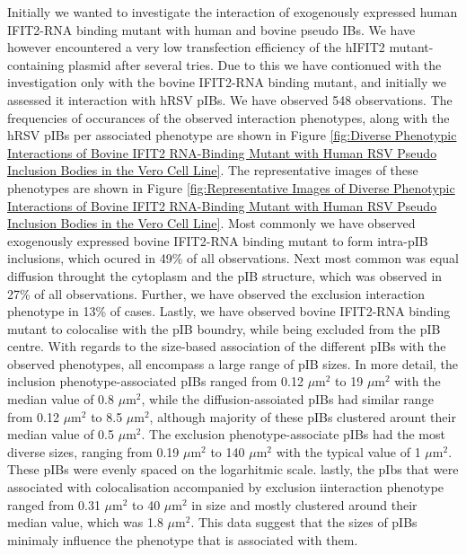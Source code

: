 Initially we wanted to investigate the interaction of exogenously expressed human IFIT2-RNA binding mutant with human and bovine pseudo IBs. We have however encountered a very low transfection efficiency of the hIFIT2 mutant-containing plasmid after several tries. Due to this we have contionued with the investigation only with the bovine IFIT2-RNA binding mutant, and initially we assessed it interaction with hRSV pIBs. We have observed 548 observations. The frequencies of occurances of the observed interaction phenotypes, along with the hRSV pIBs per associated phenotype are shown in Figure \ref{fig:Diverse Phenotypic Interactions of Bovine IFIT2 RNA-Binding Mutant with Human RSV Pseudo Inclusion Bodies in the Vero Cell Line}. The representative images of these phenotypes are shown in Figure \ref{fig:Representative Images of Diverse Phenotypic Interactions of Bovine IFIT2 RNA-Binding Mutant with Human RSV Pseudo Inclusion Bodies in the Vero Cell Line}. Most commonly we have observed exogenously expressed bovine IFIT2-RNA binding mutant to form intra-pIB inclusions, which ocured in 49\% of all observations. Next most common was equal diffusion throught the cytoplasm and the pIB structure, which was observed in 27\% of all observations. Further, we have observed the exclusion interaction phenotype in 13\% of cases. Lastly, we have observed bovine IFIT2-RNA binding mutant to colocalise with the pIB boundry, while being excluded from the pIB centre. With regards to the size-based association of the different pIBs with the observed phenotypes, all encompass a large range of pIB sizes. In more detail, the inclusion phenotype-associated pIBs ranged from 0.12 \(\mu \mbox{m}^2\) to 19 \(\mu \mbox{m}^2\) with the median value of 0.8 \(\mu \mbox{m}^2\), while the diffusion-assoiated pIBs had similar range from 0.12 \(\mu \mbox{m}^2\) to 8.5 \(\mu \mbox{m}^2\), although majority of these pIBs clustered arount their median value of 0.5 \(\mu \mbox{m}^2\). The exclusion phenotype-associate pIBs had the most diverse sizes, ranging from 0.19 \(\mu \mbox{m}^2\) to 140 \(\mu \mbox{m}^2\) with the typical value of 1 \(\mu \mbox{m}^2\). These pIBs were evenly spaced on the logarhitmic scale. lastly, the pIbs that were associated with colocalisation accompanied by exclusion iinteraction phenotype ranged from 0.31 \(\mu \mbox{m}^2\) to 40 \(\mu \mbox{m}^2\) in size and mostly clustered around their median value, which was 1.8 \(\mu \mbox{m}^2\). This data suggest that the sizes of pIBs minimaly influence the phenotype that is associated with them.

